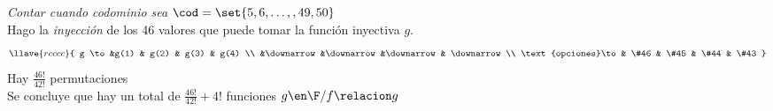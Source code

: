 \begin{enumerate}[label=\alph*)]
        \textit{Contar cuando codominio sea $\cod = \set{5,6,\dots,,49,50}$}\\
        Hago la \textit{inyección} de los 46 valores que puede tomar la función inyectiva $g$.\\
        $$
          \llave{r c c c c }{
            g \to   &g(1) & g(2) & g(3) & g(4) \\
            &\downarrow &\downarrow &\downarrow & \downarrow\\
            \text{opciones}\to & \#46 & \#45 & \#44 & \#43
          }
        $$
        Hay $\frac{46!}{42!}$ permutaciones \Tilde\\

        Se concluye que hay un total de $\frac{46!}{42!}  + 4!$ funciones $g \en \F / f \relacion g$ \Tilde
\end{enumerate}
